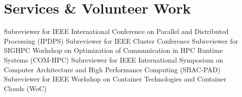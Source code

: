 \section{Services \& Volunteer Work}
   {
    Subreviewer for IEEE International Conference on
    Parallel and Distributed Processing (IPDPS)
  }
   {
    Subreviewer for IEEE Cluster Conference
  }
   {
    Subreviewer for SIGHPC Workshop on Optimization of
    Communication in HPC Runtime Systems (COM-HPC)
  }
   {
    Subreviewer for IEEE International Symposium on Computer Architecture
    and High Performance Computing (SBAC-PAD)
  }
   {
    Subreviewer for IEEE Workshop on Container
    Technologies and Container Clouds (WoC)
  }


